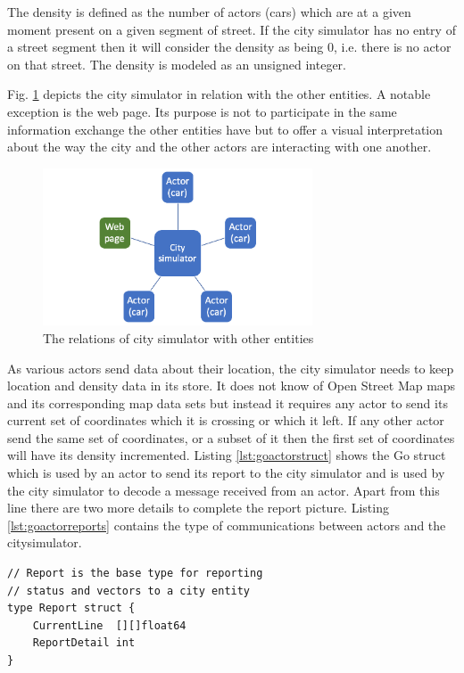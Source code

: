 \documentclass[conference]{IEEEtran}
\begin{document}
The density is defined as the number of actors (cars) which are at a given moment present on a given segment of street. If the city simulator has no entry of a street segment then it will consider the density as being 0, i.e. there is no actor on that street. The density is modeled as an unsigned integer.

Fig. \ref{fig:citysimrelations} depicts the city simulator in relation with the other entities. A notable exception is the web page. Its purpose is not to participate in the same information exchange the other entities have but to offer a visual interpretation about the way the city and the other actors are interacting with one another.

\begin{figure}
    \includegraphics[width=8cm]{CitySimulator.png}
    \centering
    \caption{The relations of city simulator with other entities}
    \label{fig:citysimrelations}
\end{figure}

As various actors send data about their location, the city simulator needs to keep location and density data in its store. It does not know of Open Street Map maps and its corresponding map data sets but instead it requires any actor to send its current set of coordinates which it is crossing or which it left. If any other actor send the same set of coordinates, or a subset of it then the first set of coordinates will have its density incremented. Listing \ref{lst:goactorstruct} shows the Go struct which is used by an actor to send its report to the city simulator and is used by the city simulator to decode a message received from an actor. Apart from this line there are two more details to complete the report picture. Listing \ref{lst:goactorreports} contains the type of communications between actors and the citysimulator.

\begin{lstlisting}[caption=Go struct for actor's report, label=lst:goactorstruct]
// Report is the base type for reporting
// status and vectors to a city entity
type Report struct {
	CurrentLine  [][]float64
	ReportDetail int
}
\end{lstlisting}
\end{document}
